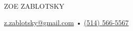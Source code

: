 \documentclass[10mm,letterpaper,notitlepage]{article}
\begin{document}
\fontsize{15mm}{16mm}\selectfont
\color{highlightcolor}
ZOE ZABLOTSKY

\fontsize{3.75mm}{4mm}\selectfont
\color{black}
\href{mailto:z.zablotsky@gmail.com}{z.zablotsky@gmail.com} • \href{tel:+514-566-5567}{(514) 566-5567}
\end{document}
